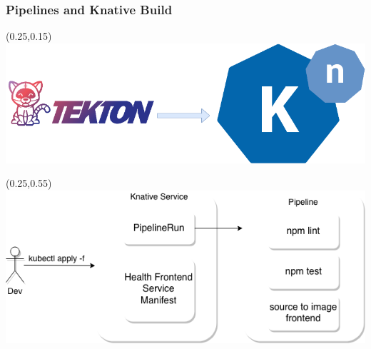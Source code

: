 \documentclass[aspectratio=169,11pt,hyperref={colorlinks=true}]{beamer}
\begin{document}
\begin{lblackrwhiteframe}
\begin{lblackrwhiteframe}
\begin{blackframe}
\begin{grayframe}
  \frametitle{Pipelines and Knative Build}
  \begin{textblock*}{0.45\paperwidth}(0.25\paperwidth,0.15\paperheight)
    \centering
    \includegraphics[width=0.45\paperwidth]{img/knative+tekton.png}
  \end{textblock*}
  \begin{textblock*}{0.45\paperwidth}(0.25\paperwidth,0.55\paperheight)
    \includegraphics[width=0.45\paperwidth]{img/tekton_dev.png}
  \end{textblock*}
\end{grayframe}


\end{blackframe}
\end{lblackrwhiteframe}
\end{lblackrwhiteframe}
\end{document}
